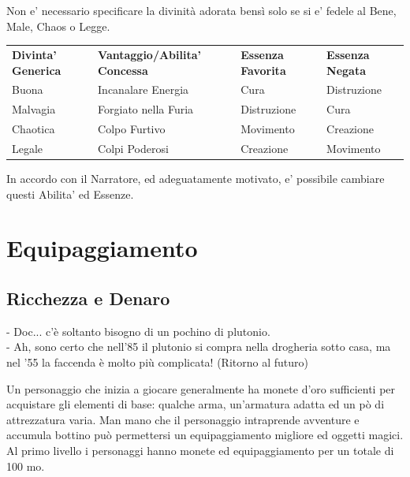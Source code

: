 \documentclass[a4paper,11pt,twoside,openany]{book}
\begin{document}
Non e' necessario specificare la divinità adorata bensì solo se si e' fedele al Bene, Male, Chaos o Legge.

\medskip

\begin{tabular}{llll}
\toprule
\textbf{Divinta' Generica}	& \textbf{Vantaggio/Abilita' Concessa} & \textbf{Essenza Favorita} & \textbf{Essenza Negata} \\
Buona	& Incanalare Energia & Cura & Distruzione \\
Malvagia	&  Forgiato nella Furia &Distruzione  & Cura \\
Chaotica	&  Colpo Furtivo&Movimento  & Creazione \\
Legale & Colpi Poderosi & Creazione &  Movimento\\
\end{tabular}

\bigskip

In accordo con il Narratore, ed adeguatamente motivato, e' possibile cambiare questi Abilita' ed Essenze.






\pagebreak

\section{Equipaggiamento}

\label{equipaggiamento}

\subsection{Ricchezza e Denaro}


\begin{tcolorbox}[enhanced,arc=5pt,boxrule=0.3pt]{
		- Doc... c'è soltanto bisogno di un pochino di plutonio.\\
		- Ah, sono certo che nell'85 il plutonio si compra nella drogheria sotto casa, ma nel '55 la faccenda è molto più complicata! (Ritorno al futuro)}\end{tcolorbox}\medskip


\label{ricchezza-e-denaro}

Un personaggio che inizia a giocare generalmente ha monete d'oro sufficienti per acquistare gli elementi di base: qualche arma, un'armatura adatta ed un pò di attrezzatura varia. Man mano che il personaggio intraprende avventure e accumula bottino può permettersi un equipaggiamento migliore ed oggetti magici. Al primo livello i personaggi hanno monete ed equipaggiamento per un totale di 100 mo.
\end{document}
